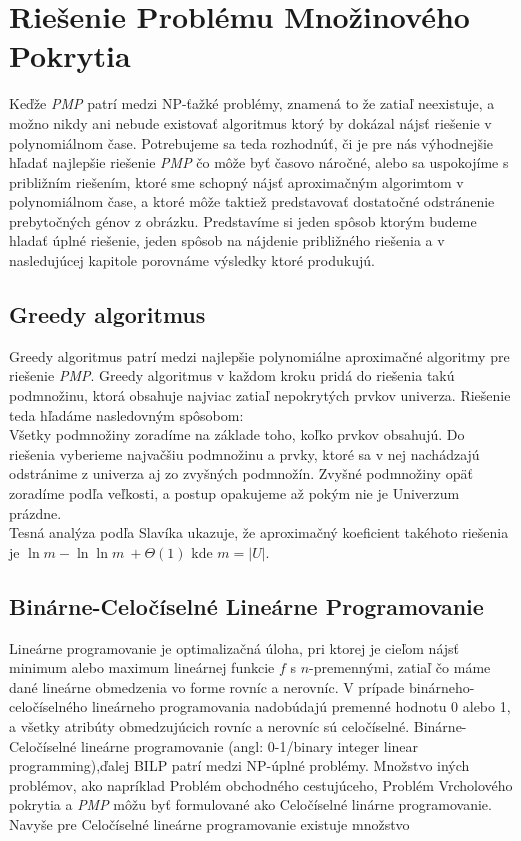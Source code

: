 \section{Riešenie Problému Množinového Pokrytia}
Keďže \emph{PMP} patrí medzi NP-ťažké problémy, znamená to že zatiaľ neexistuje,
a možno nikdy ani nebude existovať algoritmus ktorý by dokázal nájsť riešenie v polynomiálnom čase.
Potrebujeme sa teda rozhodnúť, či je pre nás výhodnejšie hľadať najlepšie riešenie \emph{PMP} 
čo môže byť časovo náročné,
alebo sa uspokojíme s približním riešením, ktoré sme schopný nájsť aproximačným algorimtom v polynomiálnom čase,
a ktoré môže taktiež predstavovať dostatočné odstránenie prebytočných génov z obrázku.
Predstavíme si jeden spôsob ktorým budeme hladať úplné riešenie, jeden spôsob na nájdenie približného riešenia a v
nasledujúcej kapitole porovnáme výsledky ktoré produkujú. 
\subsection{Greedy algoritmus}
Greedy algoritmus patrí medzi najlepšie polynomiálne aproximačné algoritmy pre riešenie \emph{PMP}.\cite{Slavik}
Greedy algoritmus v každom kroku pridá do riešenia takú podmnožinu,
ktorá obsahuje najviac zatiaľ nepokrytých prvkov univerza. Riešenie teda hľadáme nasledovným spôsobom:\\
Všetky podmnožiny zoradíme na základe toho, koľko prvkov obsahujú.
Do riešenia vyberieme najvačšiu podmnožinu a prvky, ktoré sa v nej nachádzajú odstránime z
univerza aj zo zvyšných podmnožín. Zvyšné podmnožiny opäť zoradíme podľa veľkosti,
a postup opakujeme až pokým nie je Univerzum prázdne.\\
Tesná analýza podľa Slavíka ukazuje, že aproximačný koeficient takéhoto riešenia je \(\ln m - \ln \ln m\ +\Theta(1) \) \cite{Slavik} 
kde \(m = |U|\).
\subsection{Binárne-Celočíselné Lineárne Programovanie}
\label{sub:bclp}
Lineárne programovanie je optimalizačná úloha, pri ktorej je cieľom nájsť minimum alebo
maximum lineárnej funkcie $f$ s $n$-premennými, zatiaľ čo máme dané lineárne obmedzenia vo forme rovníc a nerovníc.
V prípade binárneho-celočíselného lineárneho programovania nadobúdajú premenné hodnotu 0 alebo 1,
a všetky atribúty obmedzujúcich rovníc a nerovníc sú celočíselné.
Binárne-Celočíselné lineárne programovanie (angl: 0-1/binary integer linear programming),ďalej BILP patrí medzi NP-úplné problémy.\cite{Karp}
Množstvo iných problémov, ako napríklad Problém obchodného cestujúceho, Problém Vrcholového pokrytia a \emph{PMP} môžu byť formulované ako Celočíselné linárne programovanie.
Navyše pre Celočíselné lineárne programovanie existuje množstvo 
